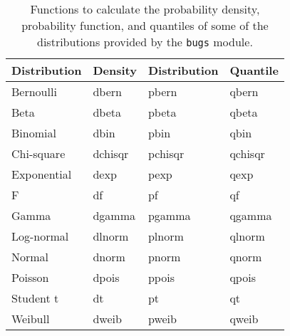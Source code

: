 \documentclass[11pt, a4paper, titlepage]{report}
\begin{document}
\begin{table}[h!]
\begin{center}
\begin{tabular}{llll}
\hline
Distribution & Density & Distribution & Quantile \\
\hline
Bernoulli          & dbern     & pbern     & qbern \\
Beta               & dbeta     & pbeta     & qbeta \\
Binomial           & dbin      & pbin      & qbin \\
Chi-square         & dchisqr   & pchisqr   & qchisqr \\
Exponential        & dexp      & pexp      & qexp \\
F                  & df        & pf        & qf \\
Gamma              & dgamma    & pgamma    & qgamma \\
Log-normal         & dlnorm    & plnorm    & qlnorm \\
Normal             & dnorm     & pnorm     & qnorm \\
Poisson            & dpois     & ppois     & qpois \\
Student t          & dt        & pt        & qt \\
Weibull            & dweib     & pweib     & qweib \\
\hline
\end{tabular}
\caption{Functions to calculate the probability density, probability
  function, and quantiles of some of the distributions provided by the
  \texttt{bugs} module. \label{table:bugs:dpq}}
\end{center}
\end{table}
\end{document}
